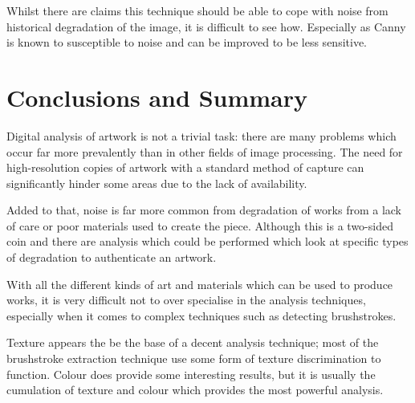 \documentclass[conference]{IEEEtran}
\begin{document}
Whilst there are claims this technique should be able to cope with noise from
historical degradation of the image, it is difficult to see how. Especially as
Canny is known to susceptible to noise and can be improved to be less
sensitive\cite{xiao10improved}.

\section{Conclusions and Summary}

Digital analysis of artwork is not a trivial task: there are many problems
which occur far more prevalently than in other fields of image processing. The
need for high-resolution copies of artwork with a standard method of capture
can significantly hinder some areas due to the lack of availability.

Added to that, noise is far more common from degradation of works from a lack
of care or poor materials used to create the piece. Although this is a
two-sided coin and there are analysis which could be performed which look at
specific types of degradation to authenticate an artwork.

With all the different kinds of art and materials which can be used to produce
works, it is very difficult not to over specialise in the analysis techniques,
especially when it comes to complex techniques such as detecting brushstrokes.

Texture appears the be the base of a decent analysis technique; most of the
brushstroke extraction technique use some form of texture discrimination to
function. Colour does provide some interesting results, but it is usually the
cumulation of texture and colour which provides the most powerful analysis.










\end{document}
